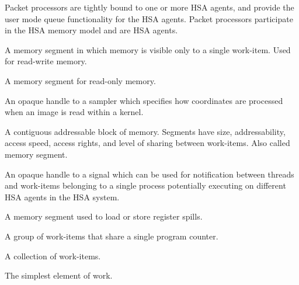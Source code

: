 \documentclass[final,oneside]{book}
\begin{document}
\begin{description}[itemsep=5pt,leftmargin=0cm, labelindent=0cm]
\item[Packet processor] Packet processors are tightly bound to one or
  more HSA agents, and provide the user mode queue functionality for the HSA
  agents. Packet processors participate in the HSA memory model and are HSA
  agents.

\item[Private segment] A memory segment in which memory is visible only to a
  single work-item. Used for read-write memory.

\item[Readonly segment] A memory segment for read-only memory.

\item[Sampler handle] An opaque handle to a sampler which specifies how
  coordinates are processed when an image is read within a kernel.

\item[Segment] A contiguous addressable block of memory. Segments have size,
  addressability, access speed, access rights, and level of sharing between
  work-items. Also called memory segment.

\item[Signal (handle)] An opaque handle to a signal which can be used for
  notification between threads and work-items belonging to a single process
  potentially executing on different HSA agents in the HSA system.

\item[Spill segment] A memory segment used to load or store register spills.

\item[Wavefront] A group of work-items that share a single program counter.

\item[Work-group] A collection of work-items.

\item[Work-item] The simplest element of work.

\end{description}

\newpage
{}
\printindex[api]
\printindex[ext]


\begin{thebibliography}{30}



\end{thebibliography}
\end{document}
